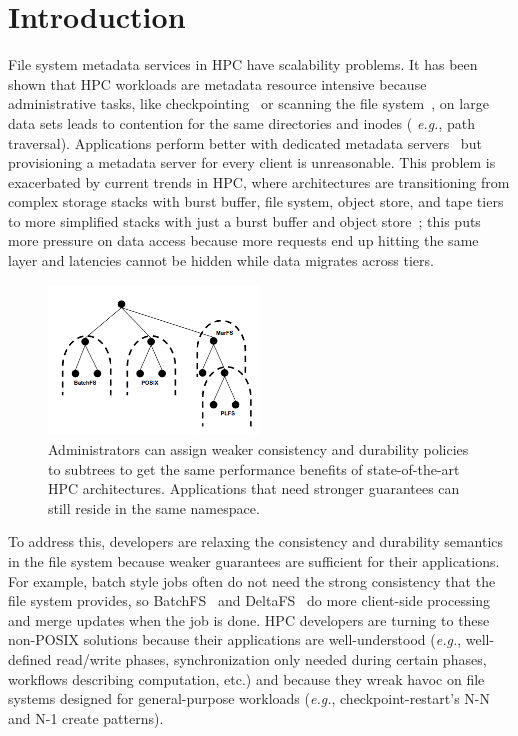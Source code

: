 \section{Introduction}

File system metadata services in HPC have scalability problems. It has been
shown that HPC workloads are metadata resource intensive because administrative
tasks, like checkpointing~\cite{bent_plfs_2009} or scanning the file
system~\cite{zheng:pdsw2014-batchfs}, on large data sets leads to contention
for the same directories and inodes ({\it
e.g.}, path traversal). Applications perform better with dedicated metadata
servers~\cite{sevilla:sc15-mantle, ren:sc2014-indexfs} but provisioning a
metadata server for every client is unreasonable. This problem is exacerbated
by current trends in HPC, where architectures are transitioning from complex
storage stacks with burst buffer, file system, object store, and tape tiers to
more simplified stacks with just a burst buffer and object
store~\cite{bent:login16-hpc-trends}; this puts more pressure on data access
because more requests end up hitting the same layer and latencies cannot be 
hidden while data migrates across tiers.

\begin{figure}[tb]
\centering
\includegraphics[width=0.5\textwidth]{figures/subtree-policies.png}
\caption{Administrators can assign weaker consistency and durability policies
to subtrees to get the same performance benefits of state-of-the-art HPC
architectures. Applications that need stronger guarantees can still reside in
the same namespace.
}\label{fig:subtree-policies}
\end{figure}


To address this, developers are relaxing the consistency and durability
semantics in the file system because weaker guarantees are sufficient for their
applications. For example, batch style jobs often do not need the strong
consistency that the file system provides, so
BatchFS~\cite{zheng:pdsw2014-batchfs} and DeltaFS~\cite{zheng:pdsw2015-deltafs}
do more client-side processing and merge updates when the job is done. HPC
developers are turning to these non-POSIX solutions because their applications
are well-understood ({\it e.g.}, well-defined read/write phases,
synchronization only needed during certain phases, workflows describing
computation, etc.) and because they wreak havoc on file systems designed for
general-purpose workloads ({\it e.g.}, checkpoint-restart's N-N and N-1 create
patterns).

